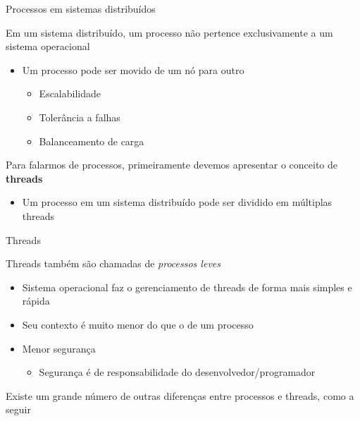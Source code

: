 \documentclass[compress]{beamer}
\begin{document}
\begin{frame}{Processos em sistemas distribuídos}

Em um sistema distribuído, um processo não pertence exclusivamente a um sistema operacional
\begin{itemize}
    \item Um processo pode ser movido de um nó para outro
    \begin{itemize}
        \item Escalabilidade
        \item Tolerância a falhas
        \item Balanceamento de carga
    \end{itemize}
\end{itemize}

\vspace{0.5cm}

Para falarmos de processos, primeiramente devemos apresentar o conceito de \textbf{threads}
\begin{itemize}
    \item Um processo em um sistema distribuído pode ser dividido em múltiplas threads
\end{itemize}
\end{frame}


\begin{frame}{Threads}

Threads também são chamadas de \textit{processos leves}
\begin{itemize}
    \item Sistema operacional faz o gerenciamento de threads de forma mais simples e rápida
    \item Seu contexto é muito menor do que o de um processo
    \item Menor segurança
    \begin{itemize}
        \item Segurança é de responsabilidade do desenvolvedor/programador
    \end{itemize}
\end{itemize}

\vspace{0.5cm}

Existe um grande número de outras diferenças entre processos e threads, como a seguir

\end{frame}

\end{document}
